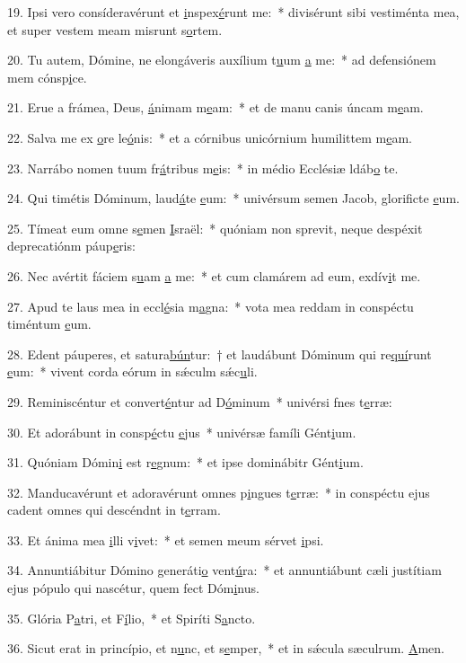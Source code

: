 19. Ipsi vero consíderavérunt et \uline{i}nspex\uline{é}runt me:~* divisérunt sibi vestiménta mea, et super vestem meam misrunt s\uline{o}rtem.\par 
20. Tu autem, Dómine, ne elongáveris auxílium t\uline{u}um \uline{a} me:~* ad defensiónem mem cónsp\uline{i}ce.\par 
21. Erue a frámea, Deus, \uline{á}nimam m\uline{e}am:~* et de manu canis úncam m\uline{e}am.\par 
22. Salva me ex \uline{o}re le\uline{ó}nis:~* et a córnibus unicórnium humilittem m\uline{e}am.\par 
23. Narrábo nomen tuum fr\uline{á}tribus m\uline{e}is:~* in médio Ecclésiæ ldáb\uline{o} te.\par 
24. Qui timétis Dóminum, laud\uline{á}te \uline{e}um:~* univérsum semen Jacob, glorificte \uline{e}um.\par 
25. Tímeat eum omne s\uline{e}men \uline{I}sraël:~* quóniam non sprevit, neque despéxit deprecatiónm páup\uline{e}ris:\par 
26. Nec avértit fáciem s\uline{u}am \uline{a} me:~* et cum clamárem ad eum, exdív\uline{i}t me.\par 
27. Apud te laus mea in eccl\uline{é}sia m\uline{a}gna:~* vota mea reddam in conspéctu timéntum \uline{e}um.\par 
28. Edent páuperes, et satura\uline{bún}tur:~† et laudábunt Dóminum qui re\uline{quí}runt \uline{e}um:~* vivent corda eórum in sǽculm sǽc\uline{u}li.\par 
29. Reminiscéntur et convert\uline{é}ntur ad D\uline{ó}minum~* univérsi fnes t\uline{e}rræ:\par 
30. Et adorábunt in consp\uline{é}ctu \uline{e}jus~* univérsæ famíli Gént\uline{i}um.\par 
31. Quóniam Dómin\uline{i} est r\uline{e}gnum:~* et ipse dominábitr Gént\uline{i}um.\par 
32. Manducavérunt et adoravérunt omnes p\uline{i}ngues t\uline{e}rræ:~* in conspéctu ejus cadent omnes qui descéndnt in t\uline{e}rram.\par 
33. Et ánima mea \uline{i}lli v\uline{i}vet:~* et semen meum sérvet \uline{i}psi.\par 
34. Annuntiábitur Dómino generáti\uline{o} vent\uline{ú}ra:~* et annuntiábunt cæli justítiam ejus pópulo qui nascétur, quem fect Dóm\uline{i}nus.\par 
35. Glória P\uline{a}tri, et F\uline{í}lio,~* et Spiríti S\uline{a}ncto.\par 
36. Sicut erat in princípio, et n\uline{u}nc, et s\uline{e}mper,~* et in sǽcula sæculrum. \uline{A}men.\par 
